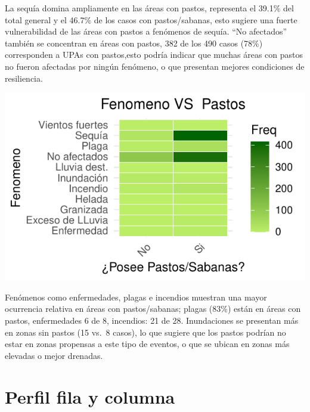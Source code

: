 \documentclass[]{tufte-handout}
\begin{document}
La sequía domina ampliamente en las áreas con pastos, representa el
39.1\% del total general y el 46.7\% de los casos con pastos/sabanas,
esto sugiere una fuerte vulnerabilidad de las áreas con pastos a
fenómenos de sequía. ``No afectados'' también se concentran en áreas con
pastos, 382 de los 490 casos (78\%) corresponden a UPAs con pastos,esto
podría indicar que muchas áreas con pastos no fueron afectadas por
ningún fenómeno, o que presentan mejores condiciones de resiliencia.

\begin{marginfigure}
\includegraphics[width=1.3\linewidth]{Informe_files/figure-latex/heat6-1} \end{marginfigure}

Fenómenos como enfermedades, plagas e incendios muestran una mayor
ocurrencia relativa en áreas con pastos/sabanas; plagas (83\%) están en
áreas con pastos, enfermedades 6 de 8, incendios: 21 de 28. Inundaciones
se presentan más en zonas sin pastos (15 vs.~8 casos), lo que sugiere
que los pastos podrían no estar en zonas propensas a este tipo de
eventos, o que se ubican en zonas más elevadas o mejor drenadas.

\section{Perfil fila y columna}\label{perfil-fila-y-columna}
\end{document}

